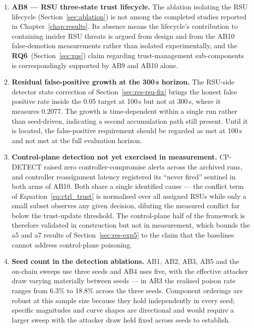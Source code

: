 \documentclass[12pt, a4paper]{report}
\begin{document}
\begin{enumerate}

\item \textbf{AB8 --- RSU three-state trust lifecycle.} The ablation
isolating the RSU lifecycle (Section~\ref{sec:ablation}) is not among
the completed studies reported in Chapter~\ref{chap:results}. Its
absence means the lifecycle's contribution to containing insider RSU
threats is argued from design and from the AB10 false-demotion
measurements rather than isolated experimentally, and the
\textbf{RQ6}~(Section~\ref{sec:rqs}) claim regarding trust-management
sub-components is correspondingly supported by AB9 and AB10 alone.

\item \textbf{Residual false-positive growth at the 300\,s horizon.}
The RSU-side detector state correction of
Section~\ref{sec:res-rsu-fix} brings the honest false positive rate
inside the 0.05 target at 100\,s but not at 300\,s, where it measures
0.2077. The growth is time-dependent within a single run rather than
seed-driven, indicating a second accumulation path still present. Until
it is located, the false-positive requirement should be regarded as met
at 100\,s and not met at the full evaluation horizon.

\item \textbf{Control-plane detection not yet exercised in
measurement.} CP-DETECT raised zero controller-compromise alerts across
the archived runs, and controller reassignment latency registered its
``never fired'' sentinel in both arms of AB10. Both share a single
identified cause --- the conflict term of Equation~\ref{eq:ctrl_trust}
is normalised over all assigned RSUs while only a small subset observes
any given decision, diluting the measured conflict far below the
trust-update threshold. The control-plane half of the framework is
therefore validated in construction but not in measurement, which
bounds the a5 and a7 results of Section~\ref{sec:res-exp5} to the claim
that the baselines cannot address control-plane poisoning.

\item \textbf{Seed count in the detection ablations.} AB1, AB2, AB3,
AB5 and the on-chain sweeps use three seeds and AB4 uses five, with the
effective attacker draw varying materially between seeds --- in AB3 the
realised poison rate ranges from 6.3\% to 18.8\% across the three
seeds. Component orderings are robust at this sample size because they
hold independently in every seed; specific magnitudes and curve shapes
are directional and would require a larger sweep with the attacker draw
held fixed across seeds to establish.


\end{enumerate}
\end{document}
